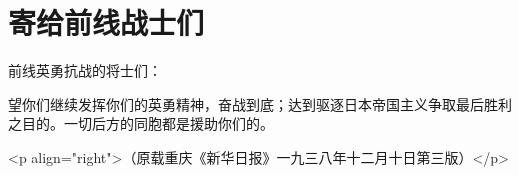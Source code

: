 \section[寄给前线战士们（一九三八年九月十八日）]{寄给前线战士们}


前线英勇抗战的将士们：

望你们继续发挥你们的英勇精神，奋战到底；达到驱逐日本帝国主义争取最后胜利之目的。一切后方的同胞都是援助你们的。

<p align="right">（原载重庆《新华日报》一九三八年十二月十日第三版）</p>

